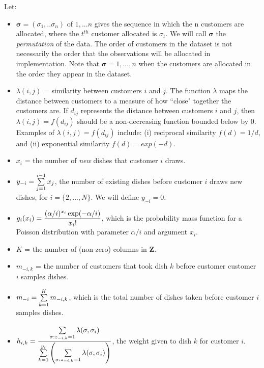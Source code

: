 \noindent
Let:
\begin{itemize}
  \item $\bm \sigma = (\sigma_1,..\sigma_n)$ of ${1,...n}$ gives the sequence
        in which the n customers are allocated, where the $t^{th}$ customer
        allocated is $\sigma_t$. We will call $\bm \sigma$ the
        \textit{permutation} of the data.  The order of customers in the
        dataset is not necessarily the order that the observations will be
        allocated in implementation. Note that $\bm \sigma = {1,...,n}$ when 
        the customers are allocated in the order they appear in the dataset.

  \item $\lambda(i,j)$ = similarity between customers $i$ and $j$. The function
        $\lambda$ maps the distance between customers to a measure of how
        ``close" together the customers are. If $d_{ij}$ represents the distance
        between customers $i$ and $j$, then $\lambda(i,j)=f(d_{ij})$ should be a
        non-decreasing function bounded below by 0. Examples of 
        $\lambda(i,j)=f(d_{ij})$ include: (i) reciprocal similarity $f(d) = 1/d$,
        and (ii) exponential similarity $f(d) = exp(-d)$.

  \item $x_i$ = the number of \textit{new} dishes that customer $i$ draws.

  \item $y_{-i} = \sum\limits_{j=1}^{i-1} x_j$, the number of existing dishes
        before customer $i$ draws new dishes, for $i=\{2,...,N\}$. We will
        define $y_{-i} = 0$.

  \item $g_i(x_i) = \displaystyle\frac{(\alpha/i)^{x_i}\exp(-\alpha/i)}{x_i!}$, 
        which is the probability mass function for a Poisson distribution 
        with parameter $\alpha/i$ and argument $x_i$.

  \item $K$ = the number of (non-zero) columns in $\bm Z$.

  \item $m_{-i,k}$ = the number of customers that took dish $k$ before customer
        customer $i$ samples dishes.

  \item $m_{-i} = \sum\limits_{k=1}^{K}m_{-i,k}$, which is the total number of dishes 
        taken before customer $i$ samples dishes.

  \item $h_{i,k} = \displaystyle\frac{\sum\limits_{\sigma:z_{-i,k}=1}^{}\lambda(\sigma,\sigma_i)}
        {\sum\limits_{k=1}^{y_i}\left(\sum\limits_{\sigma:z_{-i,k}=1}^{}\lambda(\sigma,\sigma_i)
         \right)}$, the weight given to dish $k$ for customer $i$. \\


\end{itemize}
